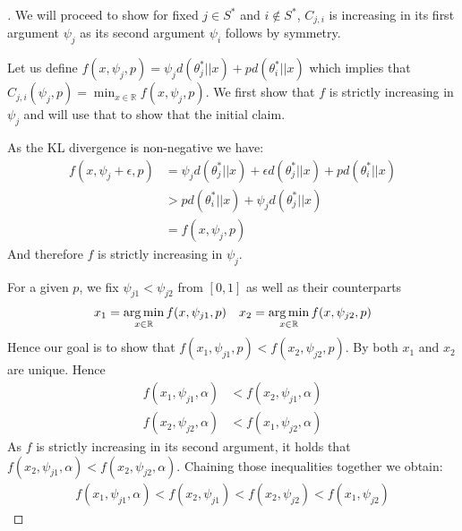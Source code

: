 \begin{proof}[]
  We will proceed to show for fixed $j \in S^*$ and $i \notin S^*$, $C_{j, i}$
  is increasing in its first argument $\psi_j$ as its second argument $\psi_i$
  follows by symmetry.

  Let us define $f(x, \psi_j, p) = \psi_j d(\theta_j^*||x) + p d(\theta_i^*||x)$
  which implies that $C_{j, i}(\psi_j, p) = \min_{x \in \mathbb{R}} f(x, \psi_j,
  p)$. We first show that $f$ is strictly increasing in $\psi_j$ and will use
  that to show that the initial claim.

  As the KL divergence is non-negative we have:
  \begin{align}
    f(x, \psi_j + \epsilon, p) &= \psi_j d(\theta_j^*||x) + \epsilon
        d(\theta_j^*||x) + p d(\theta_i^*||x) \\
      &> p d(\theta_i^*||x) + \psi_j d(\theta_j^*||x)\\
      &= f(x, \psi_j, p)
  \end{align}
  And therefore $f$ is strictly increasing in $\psi_j$.

  For a given $p$, we fix $\psi_{j1} < \psi_{j2}$ from $[0, 1]$ as well as their counterparts
  \begin{align}
    &x_1 = \operatorname*{arg\,min}_{x \in \mathbb{R}} f(x, \psi_{j1}, p)
    &x_2 = \operatorname*{arg\,min}_{x \in \mathbb{R}} f(x, \psi_{j2}, p)
  \end{align}
  Hence our goal is to show that $f(x_1, \psi_{j1}, p) < f(x_2, \psi_{j2}, p)$.
  By  both $x_1$ and $x_2$ are unique. Hence
  \begin{align}
    f(x_1, \psi_{j1}, \alpha) &< f(x_2, \psi_{j1}, \alpha) \\
    f(x_2, \psi_{j2}, \alpha) &< f(x_1, \psi_{j2}, \alpha)
  \end{align}
  As $f$ is strictly increasing in its second argument, it holds that $f(x_2,
  \psi_{j1}, \alpha) < f(x_2, \psi_{j2}, \alpha)$. Chaining those inequalities
  together we obtain:
  \begin{align}
    f(x_1, \psi_{j1}, \alpha) < f(x_2, \psi_{j1})  < f(x_2, \psi_{j2}) < f(x_1,
        \psi_{j2})
  \end{align}
\end{proof}

